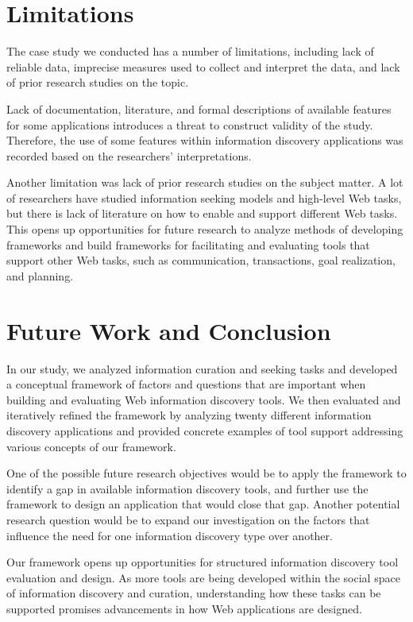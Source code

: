 \documentclass{casconpaper}
\begin{document}
{{} %

{\section{Limitations}
The case study we conducted has a number of limitations, including lack of reliable data, imprecise measures used to collect and interpret the data, and lack of prior research studies on the topic. 

Lack of documentation, literature, and formal descriptions of available features for some applications introduces a threat to construct validity of the study. Therefore, the use of some features within information discovery applications was recorded based on the researchers' interpretations. 

Another limitation was lack of prior research studies on the subject matter. A lot of researchers have studied information seeking models and high-level Web tasks, but there is lack of literature on how to enable and support different Web tasks. This opens up opportunities for future research to analyze methods of developing frameworks and build frameworks for facilitating and evaluating tools that support other Web tasks, such as communication, transactions, goal realization, and planning.

} %

{\section{ Future Work and Conclusion }
In our study, we analyzed information curation and seeking tasks and developed a conceptual framework of factors and questions that are important when building and evaluating Web information discovery tools. We then evaluated and iteratively refined the framework by analyzing twenty different information discovery applications and provided concrete examples of tool support addressing various concepts of our framework.

One of the possible future research objectives would be to apply the framework to identify a gap in available information discovery tools, and further use the framework to design an application that would close that gap. Another potential research question would be to expand our investigation on the factors that influence the need for one information discovery type over another. 

Our framework opens up opportunities for structured information discovery tool evaluation and design. As more tools are being developed within the social space of information discovery and curation, understanding how these tasks can be supported promises advancements in how Web applications are designed.

}}
\end{document}
